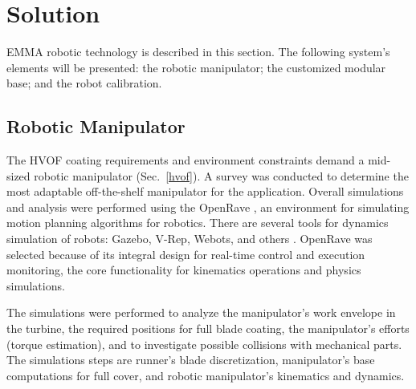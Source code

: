 \section{Solution}\label{solution}


EMMA robotic technology is described in this section. The following system's
elements will be presented: the robotic manipulator; the customized modular
base; and the robot calibration. 

\subsection{Robotic Manipulator}\label{manipulator}
The HVOF coating requirements and environment constraints demand a mid-sized
robotic manipulator (Sec.~\ref{hvof}). A survey was conducted to determine the
most adaptable off-the-shelf manipulator for the application. Overall
simu\-lations and analysis were performed using the OpenRave
\cite{diankov2008openrave}, an environment for simulating motion planning
algorithms for robotics. There are several tools for dynamics simulation of
robots: Gazebo, V-Rep, Webots, and others%
. OpenRave was selected because of its integral design for real-time control and
execution monitoring, the core functionality for kinematics operations and
physics simulations.

The simulations were performed to analyze the manipulator's work envelope in
the turbine, the required positions for full blade coating, the
manipulator's efforts (torque estimation), and to investigate possible
collisions with mechanical parts. The simulations steps are runner's
blade discretization, manipulator's base computations for full cover,
and robotic manipulator's kinematics and dynamics. 

